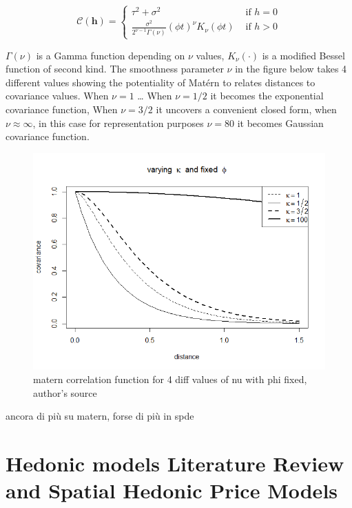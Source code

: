 \documentclass[
  12pt,
  a4paper,
  oneside]{book}
\begin{document}
\[
\mathcal{C}(\mathbf{h})=\left\{\begin{array}{ll}
\tau^{2}+\sigma^{2} & \text { if } h=0 \\
\frac{\sigma^{2}}{2^{\nu-1} \Gamma(\nu)}(\phi t)^{\nu} K_{\nu}(\phi t) & \text { if } h>0
\end{array}\right.
\]

\(\Gamma(\nu)\) is a Gamma function depending on \(\nu\) values, \(K_{\nu}(\cdot)\) is a modified Bessel function of second kind. The smoothness parameter \(\nu\) in the figure below takes 4 different values showing the potentiality of Matérn to relates distances to covariance values. When \(\nu = 1\) \ldots{} When \(\nu = 1/2\) it becomes the exponential covariance function, When \(\nu = 3/2\) it uncovers a convenient closed form, when \(\nu \approx \infty\), in this case for representation purposes \(\nu = 80\) it becomes Gaussian covariance function.

\begin{figure}
\centering
\includegraphics{images/matern.png}
\caption{matern correlation function for 4 diff values of nu with phi fixed, author's source}
\end{figure}

ancora di più su matern, forse di più in spde

\hypertarget{hedonic-models-literature-review-and-spatial-hedonic-price-models}{%
\section{Hedonic models Literature Review and Spatial Hedonic Price Models}\label{hedonic-models-literature-review-and-spatial-hedonic-price-models}}
\end{document}
